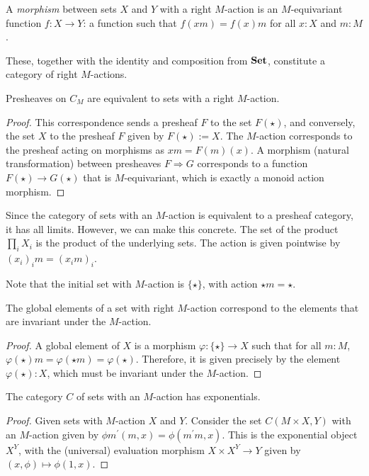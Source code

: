 \begin{definition}
  A \textit{morphism} between sets $ X $ and $ Y $ with a right $ M $-action is an $ M $-equivariant function $ f: X \to Y $: a function such that $ f(xm) = f(x)m $ for all $ x: X $ and $ m: M $.
\end{definition}

These, together with the identity and composition from $ \mathbf{Set} $, constitute a category  of right $ M $-actions.

\begin{lemma}
  Presheaves on $ C_M $ are equivalent to sets with a right $ M $-action.
\end{lemma}
\begin{proof}
  This correspondence sends a presheaf $ F $ to the set $ F(\star) $, and conversely, the set $ X $ to the presheaf $ F $ given by $ F(\star) := X $. The $ M $-action corresponds to the presheaf acting on morphisms as $ xm = F(m)(x) $. A morphism (natural transformation) between presheaves $ F \Rightarrow G $ corresponds to a function $ F(\star) \to G(\star) $ that is $ M $-equivariant, which is exactly a monoid action morphism.
\end{proof}

\begin{remark}
  Since the category of sets with an $ M $-action is equivalent to a presheaf category, it has all limits. However, we can make this concrete. The set of the product $ \prod_i X_i $ is the product of the underlying sets. The action is given pointwise by $ (x_i)_i m = (x_i m)_i $.
\end{remark}

Note that the initial set with $ M $-action is $ \{ \star \} $, with action $ \star m = \star $.

\begin{lemma}\label{lem:global-action-elements}
  The global elements of a set with right $ M $-action correspond to the elements that are invariant under the $ M $-action.
\end{lemma}
\begin{proof}
  A global element of $ X $ is a morphism $ \varphi: \{ \star \} \to X $ such that for all $ m: M $, $ \varphi(\star)m = \varphi(\star m) = \varphi(\star) $. Therefore, it is given precisely by the element $ \varphi(\star): X $, which must be invariant under the $ M $-action.
\end{proof}

\begin{lemma}
  The category $ C $ of sets with an $ M $-action has exponentials.
\end{lemma}
\begin{proof}
  Given sets with $ M $-action $ X $ and $ Y $. Consider the set $ C(M \times X, Y) $ with an $ M $-action given by $ \phi m^\prime(m, x) = \phi(m^\prime m, x) $. This is the exponential object $ X^Y $, with the (universal) evaluation morphism $ X \times X^Y \to Y $ given by $ (x, \phi) \mapsto \phi(1, x) $.
\end{proof}

